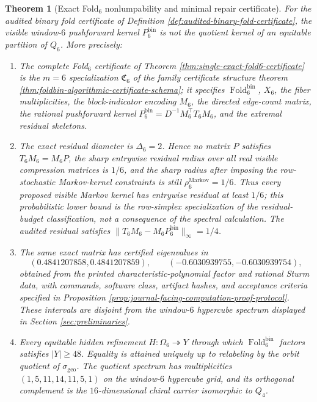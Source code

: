 \documentclass[12pt,a4paper]{article}
\theoremstyle{plain}
\newtheorem{theorem}{Theorem}[section]
\theoremstyle{definition}
\numberwithin{equation}{section}
\newcommand{\Fold}{\operatorname{Fold}}
\begin{document}
\begin{theorem}[Exact Fold\texorpdfstring{$_6$}{6} nonlumpability and minimal repair certificate]\label{thm:main-fold6-nonlumpability}
For the audited binary fold certificate of Definition \ref{def:audited-binary-fold-certificate}, the visible window-\(6\) pushforward kernel \(P_6^{\mathrm{bin}}\) is not the quotient kernel of an equitable partition of \(Q_6\).  More precisely:
\begin{enumerate}[label=\textup{(\roman*)}]
\item The complete Fold\(_6\) certificate of Theorem \ref{thm:single-exact-fold6-certificate} is the \(m=6\) specialization \(\mathfrak C_6\) of the family certificate structure theorem \ref{thm:foldbin-algorithmic-certificate-schema}; it specifies \(\Fold_6^{\mathrm{bin}}\), \(X_6\), the fiber multiplicities, the block-indicator encoding \(M_6\), the directed edge-count matrix, the rational pushforward kernel \(P_6^{\mathrm{bin}}=D^{-1}M_6^\top T_6M_6\), and the extremal residual skeletons.
\item The exact residual diameter is \(\Delta_6=2\).  Hence no matrix \(P\) satisfies \(T_6M_6=M_6P\), the sharp entrywise residual radius over all real visible compression matrices is \(1/6\), and the sharp radius after imposing the row-stochastic Markov-kernel constraints is still \(\rho_6^{\mathrm{Markov}}=1/6\).  Thus every proposed visible Markov kernel has entrywise residual at least \(1/6\); this probabilistic lower bound is the row-simplex specialization of the residual-budget classification, not a consequence of the spectral calculation.  The audited residual satisfies \(\|T_6M_6-M_6P_6^{\mathrm{bin}}\|_\infty=1/4\).
\item The same exact matrix has certified eigenvalues in
\[
(0.4841207858,0.4841207859),
\qquad
(-0.6030939755,-0.6030939754),
\]
obtained from the printed characteristic-polynomial factor and rational Sturm data, with commands, software class, artifact hashes, and acceptance criteria specified in Proposition \ref{prop:journal-facing-computation-proof-protocol}.  These intervals are disjoint from the window-\(6\) hypercube spectrum displayed in Section \ref{sec:preliminaries}.
\item Every equitable hidden refinement \(H:\Omega_6\twoheadrightarrow Y\) through which \(\Fold_6^{\mathrm{bin}}\) factors satisfies \(|Y|\ge48\).  Equality is attained uniquely up to relabeling by the orbit quotient of \(\sigma_{\mathrm{geo}}\).  The quotient spectrum has multiplicities \((1,5,11,14,11,5,1)\) on the window-\(6\) hypercube grid, and its orthogonal complement is the \(16\)-dimensional chiral carrier isomorphic to \(Q_4\).
\end{enumerate}
\end{theorem}
\end{document}
